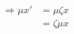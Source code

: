 \documentclass[preview]{standalone}
\begin{document}
\begin{align*}
\Rightarrow  \mu x'& =\mu \zeta x\\ & = \zeta \mu x
\end{align*}
\end{document}
